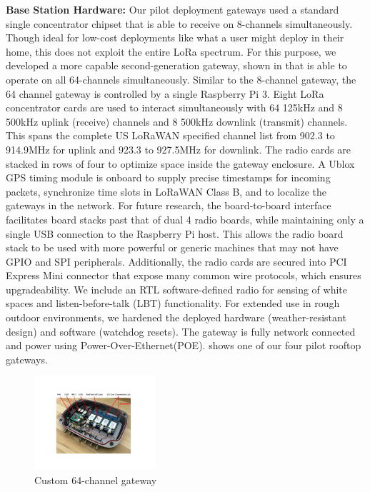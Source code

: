 \vspace*{0.1cm}\noindent \textbf{Base Station Hardware: } Our pilot deployment gateways used a standard single concentrator chipset that is able to receive on 8-channels simultaneously. Though ideal for low-cost deployments like what a user might deploy in their home, this does not exploit the entire LoRa spectrum.  For this purpose, we developed a more capable second-generation gateway, shown in  that is able to operate on all 64-channels simultaneously. 
Similar to the 8-channel gateway, the 64 channel gateway is controlled by a single Raspberry Pi 3. Eight LoRa concentrator cards are used to interact simultaneously with 64 125kHz and 8 500kHz uplink (receive) channels and 8 500kHz downlink (transmit) channels. This spans the complete US LoRaWAN specified channel list from 902.3 to 914.9MHz for uplink and 923.3 to 927.5MHz for downlink. The radio cards are stacked in rows of four to optimize space inside the gateway enclosure. A Ublox GPS timing module is onboard to supply precise timestamps for incoming packets, synchronize time slots in LoRaWAN Class B, and to localize the gateways in the network. For future research, the board-to-board interface facilitates board stacks past that of dual 4 radio boards, while maintaining only a single USB connection to the Raspberry Pi host. This allows the radio board stack to be used with more powerful or generic machines that may not have GPIO and SPI peripherals. Additionally, the radio cards are secured into PCI Express Mini connector that expose many common wire protocols, which ensures upgradeability. We include an RTL software-defined radio for sensing of white spaces and listen-before-talk (LBT) functionality. For extended use in rough outdoor environments, we hardened the deployed hardware (weather-resistant design) and software (watchdog resets). The gateway is fully network connected and power using Power-Over-Ethernet(POE).  shows one of our four pilot rooftop gateways.


\begin{figure}%
\centering
\includegraphics[width=0.4\textwidth]{figures/64-chan-photo.pdf}
\compactimg
\caption{Custom 64-channel gateway}
\label{fig:64-chan-gw}
\end{figure}

